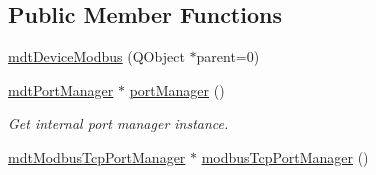 \subsection*{Public Member Functions}
\begin{DoxyCompactItemize}
\item 
\hyperlink{classmdt_device_modbus_ac69cfbe26681342ba05672ab63de2a1f}{mdtDeviceModbus} (QObject $\ast$parent=0)
\item 
\hypertarget{classmdt_device_modbus_aed892b501f8cbd372ccfda1a4fafa536}{
\hyperlink{classmdt_port_manager}{mdtPortManager} $\ast$ \hyperlink{classmdt_device_modbus_aed892b501f8cbd372ccfda1a4fafa536}{portManager} ()}
\label{classmdt_device_modbus_aed892b501f8cbd372ccfda1a4fafa536}

\begin{DoxyCompactList}\small\item\em Get internal port manager instance. \end{DoxyCompactList}\item 
\hypertarget{classmdt_device_modbus_ac547788aa95d46c00ddb1342eb46ef93}{
\hyperlink{classmdt_modbus_tcp_port_manager}{mdtModbusTcpPortManager} $\ast$ \hyperlink{classmdt_device_modbus_ac547788aa95d46c00ddb1342eb46ef93}{modbusTcpPortManager} ()}
\label{classmdt_device_modbus_ac547788aa95d46c00ddb1342eb46ef93}


\end{DoxyCompactItemize}
